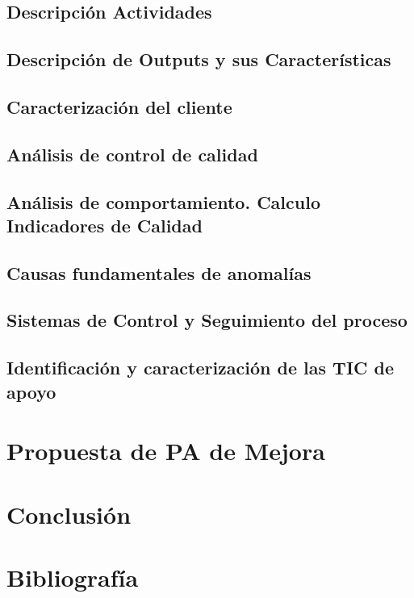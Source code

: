 	\subsection{Descripción Actividades}
	\subsection{Descripción de Outputs y sus Características}
	\subsection{Caracterización del cliente}
	\subsection{Análisis de control de calidad}
	\subsection{Análisis de comportamiento. Calculo Indicadores de Calidad}
	\subsection{Causas fundamentales de anomalías}
	\subsection{Sistemas de Control y Seguimiento del proceso}
	\subsection{Identificación y caracterización de las TIC de apoyo}
\section{Propuesta de PA de Mejora}
\section{Conclusión}
\section{Bibliografía}

	

